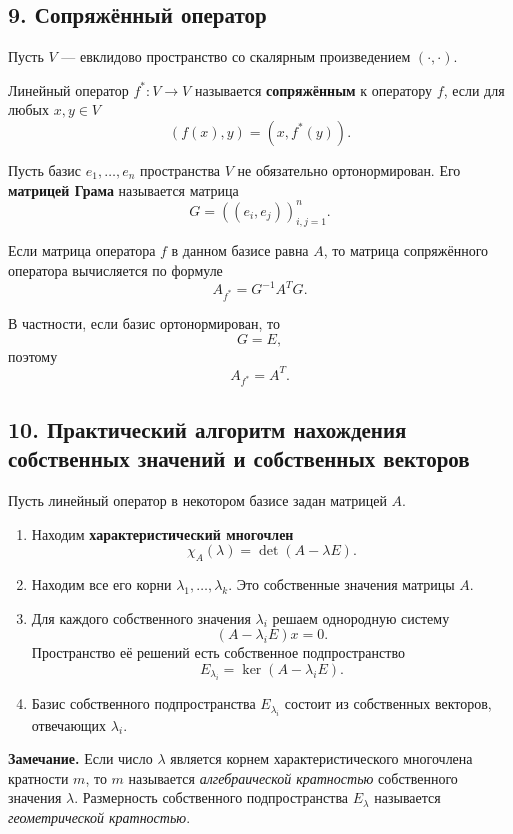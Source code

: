 \subsection*{9. Сопряжённый оператор}

\begin{definition}
Пусть $V$ — евклидово пространство со скалярным произведением $(\cdot,\cdot)$.

Линейный оператор $f^*:V\to V$ называется \textbf{сопряжённым} к оператору $f$, если для любых $x,y\in V$
\[
(f(x),y)=(x,f^*(y)).
\]
\end{definition}

Пусть базис $e_1,\dots,e_n$ пространства $V$ не обязательно ортонормирован. Его \textbf{матрицей Грама} называется матрица
\[
G=((e_i,e_j))_{i,j=1}^n.
\]

Если матрица оператора $f$ в данном базисе равна $A$, то матрица сопряжённого оператора вычисляется по формуле
\[
A_{f^*}=G^{-1}A^TG.
\]

В частности, если базис ортонормирован, то
\[
G=E,
\]
поэтому
\[
A_{f^*}=A^T.
\]

\subsection*{10. Практический алгоритм нахождения собственных значений и собственных векторов}

Пусть линейный оператор в некотором базисе задан матрицей $A$.

\begin{enumerate}
    \item Находим \textbf{характеристический многочлен}
    \[
    \chi_A(\lambda)=\det(A-\lambda E).
    \]
    
    \item Находим все его корни $\lambda_1,\dots,\lambda_k$. Это собственные значения матрицы $A$.
    
    \item Для каждого собственного значения $\lambda_i$ решаем однородную систему
    \[
    (A-\lambda_i E)x=0.
    \]
    Пространство её решений есть собственное подпространство
    \[
    E_{\lambda_i}=\ker(A-\lambda_i E).
    \]
    
    \item Базис собственного подпространства $E_{\lambda_i}$ состоит из собственных векторов, отвечающих $\lambda_i$.
\end{enumerate}

\noindent
\textbf{Замечание.}
Если число $\lambda$ является корнем характеристического многочлена кратности $m$, то $m$ называется \textit{алгебраической кратностью} собственного значения $\lambda$.  
Размерность собственного подпространства $E_\lambda$ называется \textit{геометрической кратностью}.

